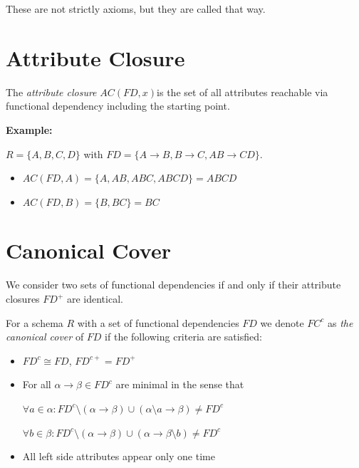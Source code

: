 These are not strictly axioms, but they are called that way.

\section{Attribute Closure}

The \emph{attribute closure} \(AC(FD, x)\)is the set of all attributes reachable via functional dependency including 
the starting point.

\textbf{Example:}

\(R = \{A,B,C,D\}\) with \(FD = \{A \to B, B \to C, AB \to CD\}\).

\begin{itemize}

    \item \(AC(FD, A) = \{A, AB, ABC, ABCD\} = ABCD\)

    \item \(AC(FD, B) = \{B, BC\} = BC\)

\end{itemize}

\section{Canonical Cover}

We consider two sets of functional dependencies if and only if their 
attribute closures \(FD^+\) are identical.

For a schema \(R\) with a set of functional dependencies \(FD\) we denote \(FC^c\) as 
\emph{the canonical cover} of \(FD\) if the following criteria are satisfied: 

\begin{itemize}

    \item \(FD^c \cong FD\), \(FD^{c+} = FD^+\)

    \item For all \(\alpha \to \beta \in FD^c\) are minimal in the sense that 

        \subitem \(\forall a \in \alpha: FD^c \setminus (\alpha \to \beta) \cup (\alpha \setminus a \to \beta) \ne FD^c\)
        
        \subitem \(\forall b \in \beta: FD^c \setminus (\alpha \to \beta) \cup (\alpha \to \beta \setminus b ) \ne FD^c\)

    \item All left side attributes appear only one time 

\end{itemize}

